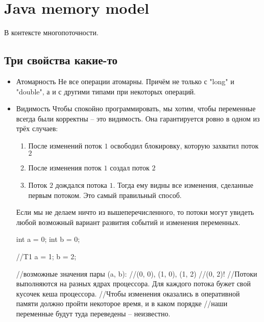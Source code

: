 \section{Java memory model}
В контексте многопоточности.
\subsection{Три свойства какие-то}%
	\begin{itemize}
	\item{Атомарность}
	Не все операции атомарны. Причём не только с \java"long" и \java"double", а и с другими типами при некоторых операций.
	\item{Видимость}
	Чтобы спокойно программировать, мы хотим, чтобы переменные всегда были корректны -- это видимость. Она гарантируется
	ровно в одном из трёх случаев:
	\begin{enumerate}
		\item
			После изменений поток $1$ освободил блокировку, которую захватил поток $2$
		\item
			После изменения поток $1$ создал поток $2$
		\item
			Поток $2$ дождался потока $1$. Тогда ему видны все изменения, сделанные первым потоком.
			Это самый правильный способ.
	\end{enumerate}
	Если мы не делаем ничто из вышеперечисленного, то потоки могут увидеть любой возможный вариант развития событий и изменения переменных.
	
	\begin{javacode}
		int a = 0;
		int b = 0;
		
		//T1
		a = 1;
		b = 2;

		//возможные значения пары (a, b):
		//(0, 0), (1, 0), (1, 2)
		//(0, 2)!
		//Потоки выполняются на разных ядрах процессора. Для каждого потока бужет свой кусочек кеша процессора.
		//Чтобы изменения оказались в оперативной памяти должно пройти некоторое время, и в каком порядке 
		//наши переменные будут туда переведены -- неизвестно.
	\end{javacode}

%
	

\end{itemize}
